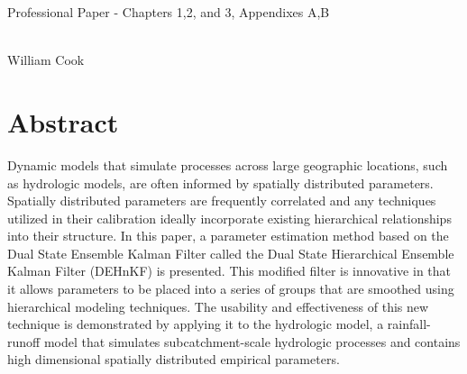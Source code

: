 \documentclass[12pt,twoside]{mitthesis}
\begin{document}
\pagestyle{plain}


\vspace*{\fill}
\begin{center}
\begin{LARGE}
Professional Paper - Chapters 1,2, and 3, Appendixes A,B
\end{LARGE}
\\
{\large William Cook}
\end{center}
\vspace*{\fill}
\pagebreak

\section{Abstract}



Dynamic models that simulate processes across large geographic locations, such as hydrologic models, are often informed by spatially distributed parameters. Spatially distributed parameters are frequently correlated and any techniques utilized in their calibration ideally incorporate existing hierarchical relationships into their structure. In this paper, a parameter estimation method based on the Dual State Ensemble Kalman Filter called the Dual State Hierarchical Ensemble Kalman Filter (DEHnKF) is presented. This modified filter is innovative in that it allows parameters to be placed into a series of groups that are smoothed using hierarchical modeling techniques. The usability and effectiveness of this new technique is demonstrated by applying it to the hydrologic model, a rainfall-runoff model that simulates subcatchment-scale hydrologic processes and contains high dimensional spatially distributed empirical parameters.





\appendix



\end{document}

